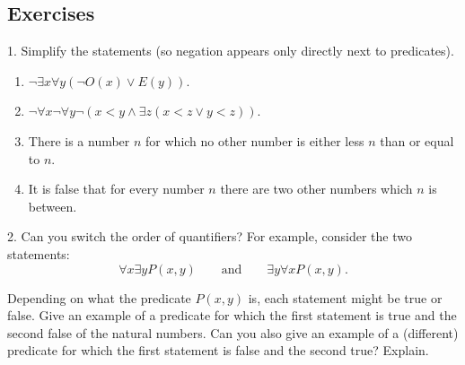 \documentclass[10pt,]{book}
\theoremstyle{plain}
\theoremstyle{definition}
\theoremstyle{definition}
\theoremstyle{definition}
\numberwithin{equation}{chapter}
\newcommand{\lt}{ < }
\begin{document}
\subsection[Exercises]{Exercises}\label{exercises-21}
\begin{exerciselist}
\item[1.]\hypertarget{exercise-230}{}
            Simplify the statements (so negation appears only directly next to predicates).
\leavevmode%
\begin{enumerate}[label=(\alph*)]
\item\hypertarget{li-1071}{}\(\neg \exists x \forall y (\neg O(x) \vee E(y))\).%
\item\hypertarget{li-1072}{}\(\neg \forall x \neg \forall y \neg(x \lt  y \wedge \exists z (x \lt  z \vee y \lt  z))\).%
\item\hypertarget{li-1073}{}
                There is a number \(n\) for which no other number is either less \(n\) than or equal to \(n\).
\item\hypertarget{li-1074}{}
                It is false that for every number \(n\) there are two other numbers which \(n\) is between.
\end{enumerate}
\par\smallskip
\item[2.]\hypertarget{exercise-231}{}
            Can you switch the order of quantifiers? For example, consider the two statements:
            \begin{equation*}
              \forall x \exists y P(x,y) \qquad \mathrm{ and } \qquad \exists y \forall x P(x,y).
            \end{equation*}
\par

            Depending on what the predicate \(P(x,y)\) is, each statement might be true or false. Give an example of a predicate for which the first statement is true and the second false of the natural numbers. Can you also give an example of a (different) predicate for which the first statement is false and the second true? Explain.
\par\smallskip
\end{exerciselist}
\typeout{************************************************}
\typeout{************************************************}
\end{document}
